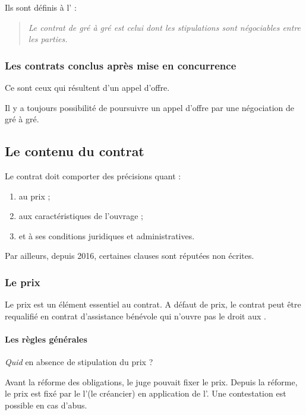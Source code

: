 			Ils sont définis à l' :
			\begin{quote}
				\itshape Le contrat de gré à gré est celui dont les stipulations sont négociables entre les parties. \lips
			\end{quote}
			
			\subsubsection{Les contrats conclus après mise en concurrence}
			
			Ce sont ceux qui résultent d'un appel d'offre.
			
			Il y a toujours possibilité de poursuivre un appel d'offre par une négociation de gré à gré.
		
		\subsection{Le contenu du contrat}
		
			Le contrat doit comporter des précisions quant :
			\begin{enumerate}
				\item au prix ;
				\item aux caractéristiques de l'ouvrage ;
				\item et à ses conditions juridiques et administratives.
			\end{enumerate}
			Par ailleurs, depuis 2016, certaines clauses sont réputées non écrites.
		
			\subsubsection{Le prix}
			
				Le prix est un élément essentiel au contrat. A défaut de prix, le contrat peut être requalifié en contrat d'assistance bénévole qui n'ouvre pas le droit aux \garSpec.
			
				\paragraph{Les règles générales}
				
				\emph{Quid} en absence de stipulation du prix ?
				
				Avant la réforme des obligations, le juge pouvait fixer le prix. Depuis la réforme, le prix est fixé par le l'\E (le créancier) en application de l'. Une contestation est possible en cas d'abus.
				
